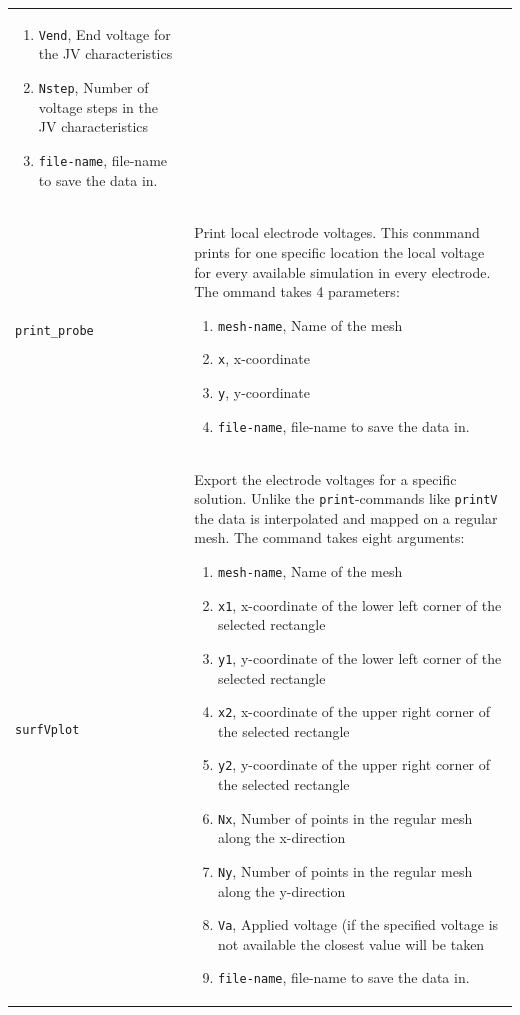 \documentclass[noshowpacs,preprintnumbers,amsmath,amssymb, letter]{revtex4}
\begin{document}
\begin{longtable}{p{}p{}}
\begin{enumerate}
\item \texttt{Vend}, End voltage for the JV characteristics
\item \texttt{Nstep}, Number of voltage steps in the JV characteristics
\item \texttt{file-name}, file-name to save the data in.
\end{enumerate}\\
\texttt{print\_probe}	& Print local electrode voltages. This conmmand prints for one specific location the local voltage for every available simulation in every electrode. The ommand takes 4 parameters:
\begin{enumerate}
\item \texttt{mesh-name}, Name of the mesh
\item \texttt{x}, x-coordinate
\item \texttt{y}, y-coordinate
\item \texttt{file-name}, file-name to save the data in.
\end{enumerate}\\
\texttt{surfVplot}		& Export the electrode voltages for a specific solution. Unlike the \texttt{print}-commands like \texttt{printV} the data is interpolated and mapped on a regular mesh. The command takes eight arguments:
\begin{enumerate}
\item \texttt{mesh-name}, Name of the mesh
\item \texttt{x1}, x-coordinate of the lower left corner of the selected rectangle
\item \texttt{y1}, y-coordinate of the lower left corner of the selected rectangle
\item \texttt{x2}, x-coordinate of the upper right corner of the selected rectangle
\item \texttt{y2}, y-coordinate of the upper right corner of the selected rectangle
\item \texttt{Nx}, Number of points in the regular mesh along the x-direction
\item \texttt{Ny}, Number of points in the regular mesh along the y-direction
\item \texttt{Va}, Applied voltage (if the specified voltage is not available the closest value will be taken
\item \texttt{file-name}, file-name to save the data in.
\end{enumerate}\\

\end{longtable}
\end{document}
